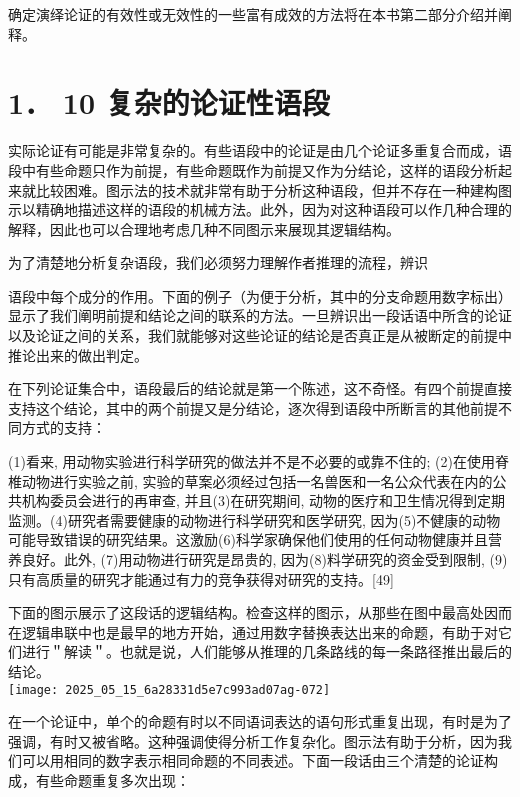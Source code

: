 确定演绎论证的有效性或无效性的一些富有成效的方法将在本书第二部分介绍并阐释。

\section*{1． 10 复杂的论证性语段}
实际论证有可能是非常复杂的。有些语段中的论证是由几个论证多重复合而成，语段中有些命题只作为前提，有些命题既作为前提又作为分结论，这样的语段分析起来就比较困难。图示法的技术就非常有助于分析这种语段，但并不存在一种建构图示以精确地描述这样的语段的机械方法。此外，因为对这种语段可以作几种合理的解释，因此也可以合理地考虑几种不同图示来展现其逻辑结构。

为了清楚地分析复杂语段，我们必须努力理解作者推理的流程，辨识

语段中每个成分的作用。下面的例子（为便于分析，其中的分支命题用数字标出）显示了我们阐明前提和结论之间的联系的方法。一旦辨识出一段话语中所含的论证以及论证之间的关系，我们就能够对这些论证的结论是否真正是从被断定的前提中推论出来的做出判定。

在下列论证集合中，语段最后的结论就是第一个陈述，这不奇怪。有四个前提直接支持这个结论，其中的两个前提又是分结论，逐次得到语段中所断言的其他前提不同方式的支持：

\begin{displayquote}
(1)看来, 用动物实验进行科学研究的做法并不是不必要的或靠不住的; (2)在使用脊椎动物进行实验之前, 实验的草案必须经过包括一名兽医和一名公众代表在内的公共机构委员会进行的再审查, 并且(3)在研究期间, 动物的医疗和卫生情况得到定期监测。(4)研究者需要健康的动物进行科学研究和医学研究, 因为(5)不健康的动物可能导致错误的研究结果。这激励(6)科学家确保他们使用的任何动物健康并且营养良好。此外, (7)用动物进行研究是昂贵的, 因为(8)料学研究的资金受到限制, (9)只有高质量的研究才能通过有力的竞争获得对研究的支持。[49]
\end{displayquote}

下面的图示展示了这段话的逻辑结构。检查这样的图示，从那些在图中最高处因而在逻辑串联中也是最早的地方开始，通过用数字替换表达出来的命题，有助于对它们进行＂解读＂。也就是说，人们能够从推理的几条路线的每一条路径推出最后的结论。\\
\texttt{[image: 2025\_05\_15\_6a28331d5e7c993ad07ag-072]}

在一个论证中，单个的命题有时以不同语词表达的语句形式重复出现，有时是为了强调，有时又被省略。这种强调使得分析工作复杂化。图示法有助于分析，因为我们可以用相同的数字表示相同命题的不同表述。下面一段话由三个清楚的论证构成，有些命题重复多次出现：

